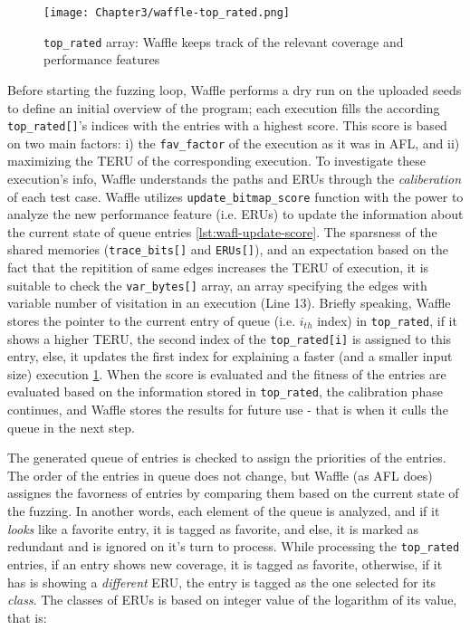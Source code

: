 \begin{figure}[!b]
  \texttt{[image: Chapter3/waffle-top\_rated.png]}
  \centering
  \caption{\texttt{top\_rated} array: Waffle keeps track of the relevant coverage and performance features}
  \label{fig:waffle-top_rated}
\end{figure}


Before starting the fuzzing loop, Waffle performs a dry run on the uploaded seeds to define an initial overview of the program; each execution fills the according \texttt{top\_rated[]}'s indices with the entries with a highest score. This score is based on two main factors: i) the \texttt{fav\_factor} of the execution as it was in AFL, and ii) maximizing the TERU of the corresponding execution. To investigate these execution's info, Waffle understands the paths and ERUs through the \textit{caliberation} of each test case. Waffle utilizes \texttt{update\_bitmap\_score} function with the power to analyze the new performance feature (i.e. ERUs) to update the information about the current state of queue entries \ref{lst:wafl-update-score}. The sparsness of the shared memories (\texttt{trace\_bits[]} and \texttt{ERUs[]}), and an expectation based on the fact that the repitition of same edges increases the TERU of execution, it is suitable to check the \texttt{var\_bytes[]} array, an array specifying the edges with variable number of visitation in an execution (Line 13). Briefly speaking, Waffle stores the pointer to the current entry of queue (i.e. $i_{th}$ index) in \texttt{top\_rated}, if it shows a higher TERU, the second index of the \texttt{top\_rated[i]} is assigned to this entry, else, it updates the first index for explaining a faster (and a smaller input size) execution \ref{fig:waffle-top_rated}. When the score is evaluated and the fitness of the entries are evaluated based on the information stored in \texttt{top\_rated}, the calibration phase continues, and Waffle stores the results for future use - that is when it culls the queue in the next step.




The generated queue of entries is checked to assign the priorities of the entries. The order of the entries in queue does not change, but Waffle (as AFL does) assignes the favorness of entries by comparing them based on the current state of the fuzzing. In another words, each element of the queue is analyzed, and if it \textit{looks} like a favorite entry, it is tagged as favorite, and else, it is marked as redundant and is ignored on it's turn to process. While processing the \texttt{top\_rated} entries, if an entry shows new coverage, it is tagged as favorite, otherwise, if it has is showing a \textit{different} ERU, the entry is tagged as the one selected for its \textit{class}. The classes of ERUs is based on integer value of the logarithm of its value, that is:

